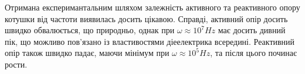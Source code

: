 Отримана експеримантальним шляхом залежність активного та реактивного опору котушки від частоти виявилась досить цікавою. Справді, активний опір досить швидко обвалюється, що природньо, однак при $\omega \approx 10^7 Hz$ має досить дивний пік, що можливо пов'язано із властивостями діеелектрика всередині. Реактивний опір також швидко падає, маючи мінімум при $\omega \approx 10^5 Hz$, та після цього починає рости.

\begin{figure}[h]
    \begin{minipage}[h]{0.47\linewidth}
         \\
    \end{minipage}
    \hfill
    \begin{minipage}[h]{0.47\linewidth}
        \\

\end{minipage}
\end{figure}
